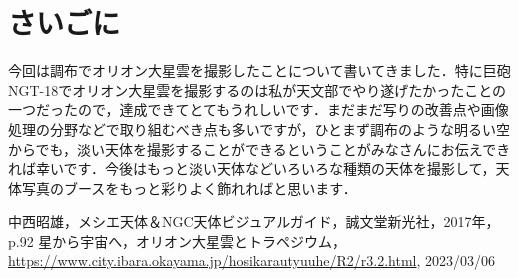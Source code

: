\documentclass[supernova_2023]{subfiles}
\begin{document}
\section{さいごに}
今回は調布でオリオン大星雲を撮影したことについて書いてきました．特に巨砲NGT-18でオリオン大星雲を撮影するのは私が天文部でやり遂げたかったことの一つだったので，達成できてとてもうれしいです．まだまだ写りの改善点や画像処理の分野などで取り組むべき点も多いですが，ひとまず調布のような明るい空からでも，淡い天体を撮影することができるということがみなさんにお伝えできれば幸いです．今後はもっと淡い天体などいろいろな種類の天体を撮影して，天体写真のブースをもっと彩りよく飾れればと思います．
\begin{thebibliography}{1}
   中西昭雄，メシエ天体＆NGC天体ビジュアルガイド，誠文堂新光社，2017年，p.92
   星から宇宙へ，オリオン大星雲とトラペジウム，\url{https://www.city.ibara.okayama.jp/hosikarautyuuhe/R2/r3.2.html}, 2023/03/06
\end{thebibliography}
\end{document}
